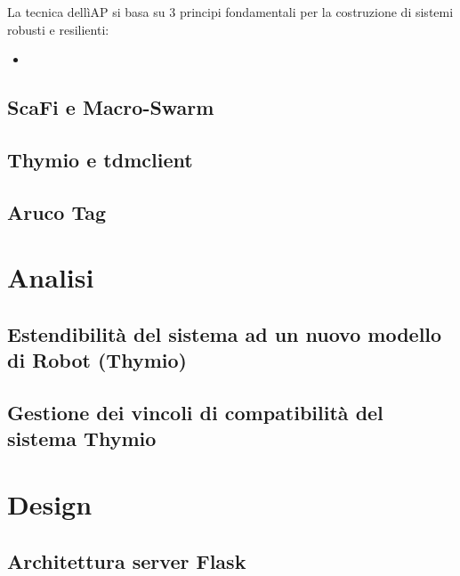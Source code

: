 \documentclass[12pt,a4paper,openright,twoside]{book}
\begin{document}
La tecnica dellì\ac{AP} si basa su 3 principi fondamentali per la costruzione di sistemi robusti e resilienti:

\begin{itemize}
    \item 
\end{itemize}

\section{ScaFi e Macro-Swarm}

\section{Thymio e tdmclient}

\section{Aruco Tag}

\chapter{Analisi}
\label{chap:analisi}

\section{Estendibilità del sistema ad un nuovo modello di Robot (Thymio)}

\section{Gestione dei vincoli di compatibilità del sistema Thymio}


\chapter{Design}
\label{chap:design}

\section{Architettura server Flask}
\end{document}
